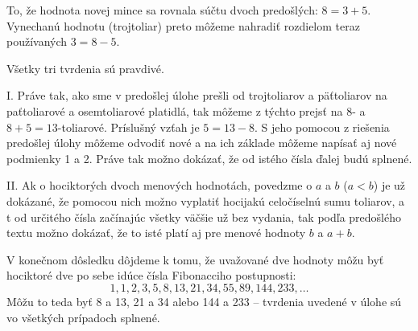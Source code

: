 {{To, že hodnota novej mince sa rovnala súčtu dvoch predošlých: $8=3+5$. Vynechanú hodnotu (trojtoliar) preto môžeme nahradiť rozdielom teraz používaných $3=8-5$.

Všetky tri tvrdenia sú pravdivé. 

I. Práve tak, ako sme v predošlej úlohe prešli od trojtoliarov a päťtoliarov na paťtoliarové a osemtoliarové platidlá, tak môžeme z týchto prejsť na 8- a $8+5=13$-toliarové. Príslušný vzťah je $5=13-8$. S jeho pomocou z  riešenia predošlej úlohy môžeme odvodiť nové a na ich základe môžeme napísať aj nové podmienky 1 a 2. Práve tak možno dokázať, že od istého čísla ďalej budú splnené. 

II. Ak o hociktorých dvoch menových hodnotách, povedzme o $a$ a $b$ ($a<b$) je už dokázané, že pomocou nich možno vyplatiť hocijakú celočíselnú sumu toliarov, a t od určitého čísla začínajúc všetky väčšie už bez vydania, tak podľa predošlého textu možno dokázať, že to isté platí aj pre menové hodnoty $b$ a $a+b$.

V konečnom dôsledku dôjdeme k tomu, že uvažované dve hodnoty môžu byť hociktoré dve po sebe idúce čísla Fibonacciho postupnosti:
$$1, 1, 2, 3, 5, 8, 13, 21, 34, 55, 89, 144, 233, \ldots$$
Môžu to teda byť 8 a 13, 21 a 34 alebo 144 a 233 -- tvrdenia uvedené v úlohe sú vo všetkých prípadoch splnené. \\
\\
}

}
